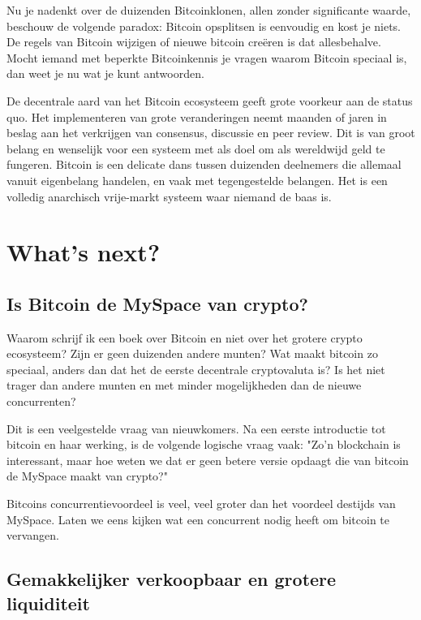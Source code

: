 \documentclass[
  letterpaper,
]{scrbook}
\begin{document}
Nu je nadenkt over de duizenden Bitcoinklonen, allen zonder significante
waarde, beschouw de volgende paradox: Bitcoin opsplitsen is eenvoudig en
kost je niets. De regels van Bitcoin wijzigen of nieuwe bitcoin creëren
is dat allesbehalve. Mocht iemand met beperkte Bitcoinkennis je vragen
waarom Bitcoin speciaal is, dan weet je nu wat je kunt antwoorden.

De decentrale aard van het Bitcoin ecosysteem geeft grote voorkeur aan
de status quo. Het implementeren van grote veranderingen neemt maanden
of jaren in beslag aan het verkrijgen van consensus, discussie en peer
review. Dit is van groot belang en wenselijk voor een systeem met als
doel om als wereldwijd geld te fungeren. Bitcoin is een delicate dans
tussen duizenden deelnemers die allemaal vanuit eigenbelang handelen, en
vaak met tegengestelde belangen. Het is een volledig anarchisch
vrije-markt systeem waar niemand de baas is.


\hypertarget{whats-next}{%
\chapter{What's next?}\label{whats-next}}

\hypertarget{is-bitcoin-de-myspace-van-crypto}{%
\section{Is Bitcoin de MySpace van
crypto?}\label{is-bitcoin-de-myspace-van-crypto}}

Waarom schrijf ik een boek over Bitcoin en niet over het grotere crypto
ecosysteem? Zijn er geen duizenden andere munten? Wat maakt bitcoin zo
speciaal, anders dan dat het de eerste decentrale cryptovaluta is? Is
het niet trager dan andere munten en met minder mogelijkheden dan de
nieuwe concurrenten?

Dit is een veelgestelde vraag van nieuwkomers. Na een eerste introductie
tot bitcoin en haar werking, is de volgende logische vraag vaak: "Zo'n
blockchain is interessant, maar hoe weten we dat er geen betere versie
opdaagt die van bitcoin de MySpace maakt van crypto?"

Bitcoins concurrentievoordeel is veel, veel groter dan het voordeel
destijds van MySpace. Laten we eens kijken wat een concurrent nodig
heeft om bitcoin te vervangen.

\hypertarget{gemakkelijker-verkoopbaar-en-grotere-liquiditeit}{%
\section{Gemakkelijker verkoopbaar en grotere
liquiditeit}\label{gemakkelijker-verkoopbaar-en-grotere-liquiditeit}}
\end{document}
